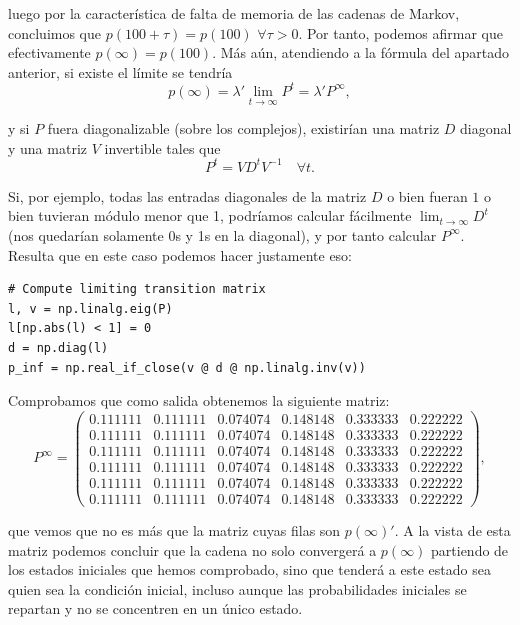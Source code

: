 \documentclass[11pt,a4paper]{article}
\begin{document}
luego por la característica de falta de memoria de las cadenas de Markov, concluimos que $p(100 + \tau)=p(100)$ $\forall \tau > 0$. Por tanto, podemos afirmar que efectivamente $p(\infty)=p(100)$. Más aún, atendiendo a la fórmula del apartado anterior, si existe el límite se tendría
\[
p(\infty) = \lambda' \lim_{t\to\infty} P^t = \lambda' P^\infty,
\]

y si $P$ fuera diagonalizable (sobre los complejos), existirían una matriz $D$ diagonal y una matriz $V$ invertible tales que
\[
P^t = VD^tV^{-1} \quad \forall t.
\]

Si, por ejemplo, todas las entradas diagonales de la matriz $D$ o bien fueran $1$ o bien tuvieran módulo menor que 1, podríamos calcular fácilmente $\lim_{t\to\infty} D^t$ (nos quedarían solamente 0s y 1s en la diagonal), y por tanto calcular $P^\infty$. Resulta que en este caso podemos hacer justamente eso:

\begin{verbatim}
# Compute limiting transition matrix
l, v = np.linalg.eig(P)
l[np.abs(l) < 1] = 0
d = np.diag(l)
p_inf = np.real_if_close(v @ d @ np.linalg.inv(v))
\end{verbatim}

Comprobamos que como salida obtenemos la siguiente matriz:
\[
P^{\infty} = \begin{pmatrix}
  0.111111 & 0.111111 & 0.074074 & 0.148148 & 0.333333 & 0.222222\\
  0.111111 & 0.111111 & 0.074074 & 0.148148 & 0.333333 & 0.222222\\
  0.111111 & 0.111111 & 0.074074 & 0.148148 & 0.333333 & 0.222222\\
  0.111111 & 0.111111 & 0.074074 & 0.148148 & 0.333333 & 0.222222\\
  0.111111 & 0.111111 & 0.074074 & 0.148148 & 0.333333 & 0.222222\\
  0.111111 & 0.111111 & 0.074074 & 0.148148 & 0.333333 & 0.222222
\end{pmatrix},
\]

que vemos que no es más que la matriz cuyas filas son $p(\infty)'$. A la vista de esta matriz podemos concluir que la cadena no solo convergerá a $p(\infty)$ partiendo de los estados iniciales que hemos comprobado, sino que tenderá a este estado sea quien sea la condición inicial, incluso aunque las probabilidades iniciales se repartan y no se concentren en un único estado.
\end{document}
